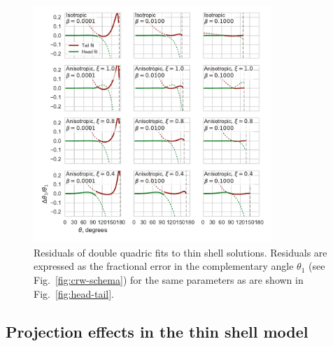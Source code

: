 


\begin{figure}
  \centering
  \includegraphics[width=0.8\textwidth]{figs/conic-head-tail-residuals}
  \caption[]{Residuals of double quadric fits to thin shell solutions.
    Residuals are expressed as the fractional error in the
    complementary angle \(\theta_1\) (see Fig.~\ref{fig:crw-schema}) for
    the same parameters as are shown in Fig.~\ref{fig:head-tail}.}
  \label{fig:head-tail-residuals}
\end{figure}

\subsection{Projection effects in the thin shell model}
\label{sec:proj-effects-thin}


